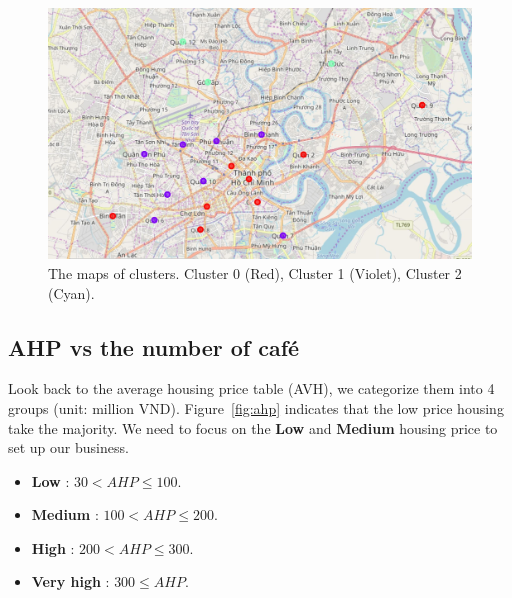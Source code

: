 \documentclass[12pt,a4paper]{article}
\begin{document}
\begin{center}
    \begin{figure}[htp]
    \begin{center}
     \includegraphics[width=\textwidth]{fig/cluster}
    \end{center}
    \caption{The maps of clusters. Cluster 0 (Red), Cluster 1 (Violet), Cluster 2 (Cyan).}
    \label{fig:cluster}
    \end{figure}
\end{center}

\subsection{AHP vs the number of café}

Look back to the average housing price table (AVH), we categorize them into 4 groups (unit: million VND). Figure~\ref{fig:ahp} indicates that the low price housing take the majority. We need to focus on the \textbf{Low} and \textbf{Medium} housing price to set up our business.

\begin{itemize}
\item \textbf{Low} : $30 < AHP \le 100$.
\item \textbf{Medium} : $100 < AHP \le 200$.
\item \textbf{High} : $200 < AHP \le 300$.
\item \textbf{Very high} : $300 \le AHP$.
\end{itemize}
\end{document}
